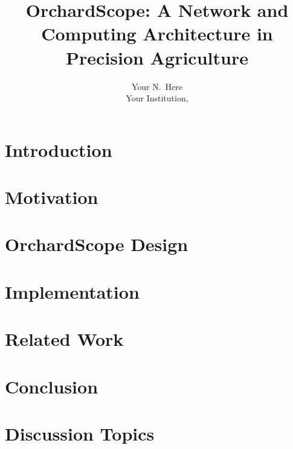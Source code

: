 \documentclass[letterpaper,twocolumn,10pt]{article}
\begin{document}
\title{\Large \bf OrchardScope: A Network and Computing Architecture in Precision Agriculture}


\newcommand\fatima[1]{\textcolor{magenta}{Fatima: #1}}
\newcommand\noman[1]{\textcolor{red}{Noman: #1}}

\author{
{\rm Your N.\ Here}\\
Your Institution,
} %




\maketitle

\begin{abstract}

\end{abstract}

\section{Introduction}


\section{Motivation}


\section{OrchardScope Design}

\label{design}

\section{Implementation}

\label{implementation}

\section{Related Work}

\label{related}

\section{Conclusion}

\label{conclusion}

\section{Discussion Topics}

\label{discussion}



\end{document}
